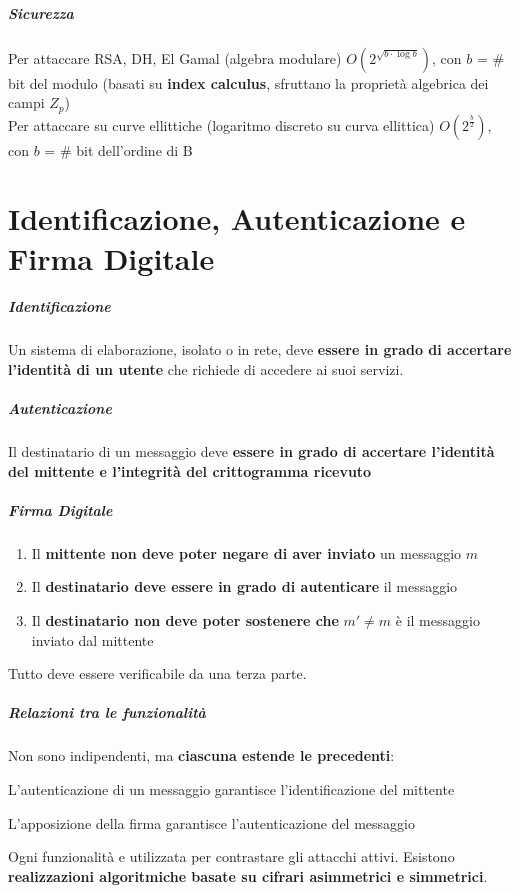 \documentclass[10pt]{book}
\begin{document}
\paragraph{Sicurezza} Per attaccare RSA, DH, El Gamal (algebra modulare) $O(2^{\sqrt{b\cdot\log b}})$, con $b$ = \# bit del modulo (basati su \textbf{index calculus}, sfruttano la proprietà algebrica dei campi $Z_p$)\\
Per attaccare su curve ellittiche (logaritmo discreto su curva ellittica) $O(2^{\frac{b}{2}})$, con $b$ = \# bit dell'ordine di B
\chapter{Identificazione, Autenticazione e Firma Digitale}
\paragraph{Identificazione} Un sistema di elaborazione, isolato o in rete, deve \textbf{essere in grado di accertare l'identità di un utente} che richiede di accedere ai suoi servizi.
\paragraph{Autenticazione} Il destinatario di un messaggio deve \textbf{essere in grado di accertare l'identità del mittente e l'integrità del crittogramma ricevuto}
\paragraph{Firma Digitale} \begin{enumerate}
	\item Il \textbf{mittente non deve poter negare di aver inviato} un messaggio $m$
	\item Il \textbf{destinatario deve essere in grado di autenticare} il messaggio
	\item Il \textbf{destinatario non deve poter sostenere che} $m'\neq m$ è il messaggio inviato dal mittente
\end{enumerate}
Tutto deve essere verificabile da una terza parte.
\paragraph{Relazioni tra le funzionalità} Non sono indipendenti, ma \textbf{ciascuna estende le precedenti}:
\begin{list}{}{}
	\item L'autenticazione di un messaggio garantisce l'identificazione del mittente
	\item L'apposizione della firma garantisce l'autenticazione del messaggio
\end{list}
Ogni funzionalità e utilizzata per contrastare gli attacchi attivi. Esistono \textbf{realizzazioni algoritmiche basate su cifrari asimmetrici e simmetrici}.
\end{document}
